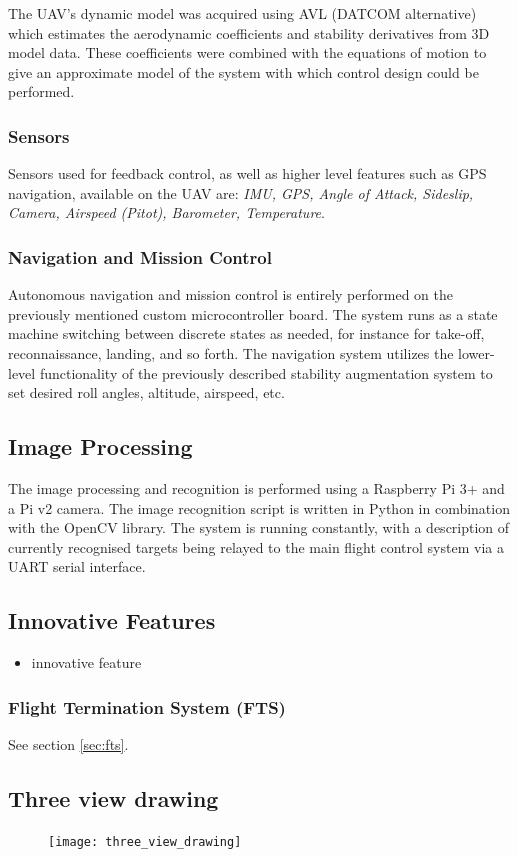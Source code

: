 The UAV's dynamic model was acquired using AVL (DATCOM alternative) which estimates the aerodynamic coefficients and stability derivatives from 3D model data. These coefficients were combined with the equations of motion to give an approximate model of the system with which control design could be performed. \\

\subsubsection{Sensors}
Sensors used for feedback control, as well as higher level features such as GPS navigation, available on the UAV are: \textit{IMU, GPS, Angle of Attack, Sideslip, Camera, Airspeed (Pitot), Barometer, Temperature}.

\subsubsection{Navigation and Mission Control}
Autonomous navigation and mission control is entirely performed on the previously mentioned custom microcontroller board. The system runs as a state machine switching between discrete states as needed, for instance for take-off, reconnaissance, landing, and so forth. The navigation system utilizes the lower-level functionality of the previously described stability augmentation system to set desired roll angles, altitude, airspeed, etc.

\subsection{Image Processing}
The image processing and recognition is performed using a Raspberry Pi 3+ and a Pi v2 camera. The image recognition script is written in Python in combination with the OpenCV library. The system is running constantly, with a description of currently recognised targets being relayed to the main flight control system via a UART serial interface.

\subsection{Innovative Features}
\begin{itemize}
	\item
		innovative feature
\end{itemize}

\subsubsection{Flight Termination System (FTS)}
See section \ref{sec:fts}.

\subsection{Three view drawing}
\vspace*{-0.4cm}
\begin{figure}[H]
	\centering
	\texttt{[image: three\_view\_drawing]}
\end{figure}
